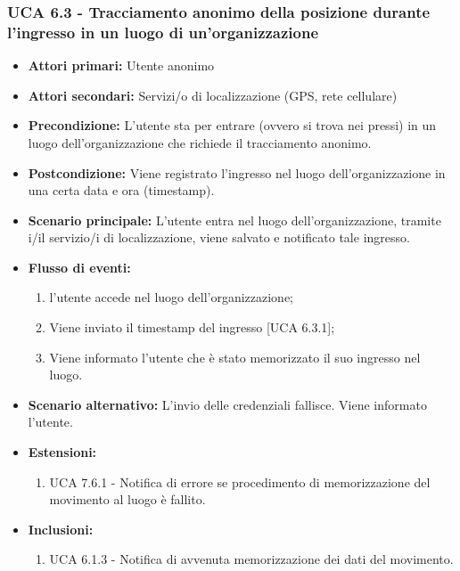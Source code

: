 \subsubsection{UCA 6.3 - Tracciamento anonimo della posizione durante l'ingresso in un luogo di un'organizzazione}
\begin{itemize}
	\item \textbf{Attori primari:} Utente anonimo
	\item \textbf{Attori secondari:} Servizi/o di localizzazione (GPS, rete cellulare)
	\item \textbf{Precondizione:} L'utente sta per entrare (ovvero si trova nei pressi) in un luogo dell'organizzazione che richiede il tracciamento anonimo.
	\item \textbf{Postcondizione:} Viene registrato l'ingresso nel luogo dell'organizzazione in una certa data e ora (timestamp).
	\item \textbf{Scenario principale:} L'utente entra nel luogo dell'organizzazione, tramite i/il servizio/i di localizzazione, viene salvato e notificato tale ingresso.
	\item \textbf{Flusso di eventi:}
	\begin{enumerate}
		\item l'utente accede nel luogo dell'organizzazione;
		\item Viene inviato il timestamp  del ingresso [UCA 6.3.1];
		\item Viene informato l'utente che è stato memorizzato il suo ingresso nel luogo.
	\end{enumerate}
	\item \textbf{Scenario alternativo:} L'invio delle credenziali fallisce. Viene informato l'utente.
	\item \textbf{Estensioni:}
	\begin{enumerate}
		\item UCA 7.6.1 - Notifica di errore se procedimento di memorizzazione del movimento al luogo è fallito.
	\end{enumerate}
	\item \textbf{Inclusioni:}
	\begin{enumerate}
		\item UCA 6.1.3 - Notifica di avvenuta memorizzazione dei dati del movimento.
	\end{enumerate}
\end{itemize}

